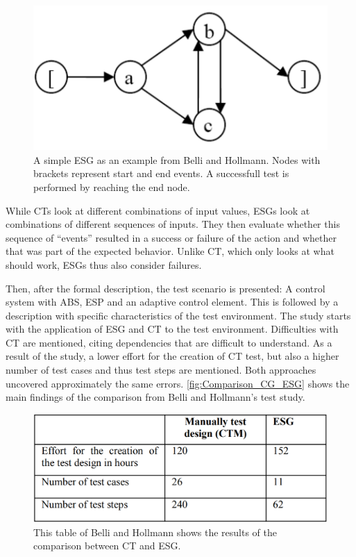 \begin{figure}[H]
\centering
\includegraphics[scale=0.6]{../../individual/groeger/images/ESG_Beispiel.png} 
\caption{A simple ESG as an example from Belli and Hollmann\cite{Belli2009}. Nodes with brackets represent start and end events. A successfull test is performed by reaching the end node.}
\label{fig:Approach2_CT}
\end{figure}

While CTs look at different combinations of input values, ESGs look at combinations of different sequences of inputs. They then evaluate whether this sequence of \enquote{events} resulted in a success or failure of the action and whether that was part of the expected behavior. Unlike CT, which only looks at what should work, ESGs thus also consider failures.

Then, after the formal description, the test scenario is presented: A control system with ABS, ESP and an adaptive control element. This is followed by a description with specific characteristics of the test environment. The study starts with the application of ESG and CT to the test environment. Difficulties with CT are mentioned, citing dependencies that are difficult to understand. As a result of the study, a lower effort for the creation of CT test, but also a higher number of test cases and thus test steps are mentioned. Both approaches uncovered approximately the same errors. \autoref{fig:Comparison_CG_ESG} shows the main findings of the comparison from Belli and Hollmann's\cite{Belli2009} test study.

\begin{figure}[H]
\centering
\includegraphics[scale=0.4]{../../individual/groeger/images/Comparison_CG_ESG.png} 
\caption{This table of Belli and Hollmann\cite{Belli2009} shows the results of the comparison between CT and ESG.}
\label{fig:Comparison_CG_ESG}
\end{figure}

